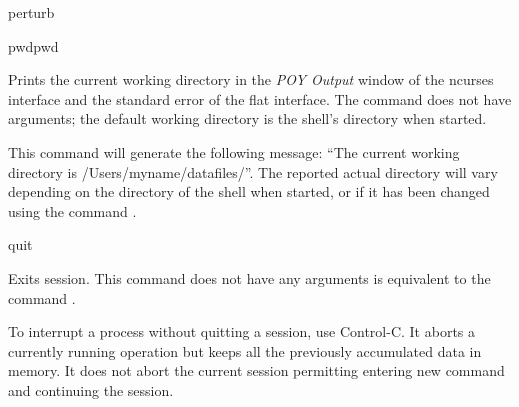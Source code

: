 \begin{command}{perturb}{}
\begin{poyexamples}
	\end{poyexamples}
               
	\begin{poyalso}
	\end{poyalso}
	
\end{command}

\begin{command}{pwd}{pwd}

	\syntax{\obligatory{()}}
	
	\begin{poydescription}
         Prints the current working directory in the \emph{POY Output} window of
         the ncurses interface and the standard error of the flat interface.
         The command  does not have arguments; the default
         working directory is the shell's directory when \poy started.
	\end{poydescription}
	
	\begin{poyexamples}
		\poyexample{pwd()}
            {This command will generate the following message: ``The current
            working directory is /Users/myname/datafiles/''. The reported actual
            directory will vary depending on the directory of the shell when
            \poy started, or if it has been changed using the command
            .}
    \end{poyexamples}

    \begin{poyalso}
    \end{poyalso}

\end{command}

\begin{command}{quit}{}
	
	\syntax{\obligatory{()}}
	
	\begin{poydescription}
        Exits \poy session. This command does not have any arguments
         is equivalent to the command .
        \end{poydescription}

	\begin{statement}
	 To interrupt a process without quitting a \poy session, use Control-C.
	 It aborts a currently running operation but keeps all the previously accumulated
	 data in memory. It does not abort the current session permitting entering new
	 command and continuing the session.
	\end{statement}

    \begin{poyexamples}
    \end{poyexamples}
    
    \begin{poyalso}
    \end{poyalso}
\end{command}

